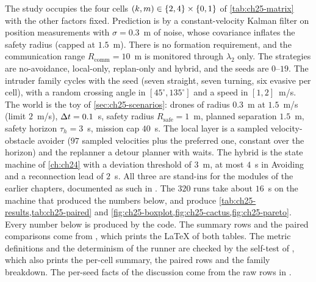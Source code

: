 \begin{example}
\label{ex:ch25-study}
The study occupies the four cells $(k, m) \in \left\{ 2, 4 \right\} \times \left\{ 0, 1 \right\}$
of \cref{tab:ch25-matrix} with the other factors fixed. Prediction is by a
constant-velocity Kalman filter on position measurements with
$\sigma = 0.3$~m of noise, whose covariance inflates the safety radius
(capped at $1.5$~m). There is no formation requirement, and the
communication range $R_{\mathrm{comm}} = 10$~m is monitored through
$\lambda_2$ only. The strategies are no-avoidance, local-only, replan-only
and hybrid, and the seeds are $0$--$19$. The intruder family cycles with the
seed (seven straight, seven turning, six evasive per cell), with a random
crossing angle in $[45^\circ, 135^\circ]$ and a speed in $[1, 2]$~m/s. The
world is the toy of
\cref{sec:ch25-scenarios}: drones of radius $0.3$~m at $1.5$~m/s (limit
$2$~m/s), $\Delta t = 0.1$~s, safety radius $R_{\mathrm{safe}} = 1$~m, planned
separation $1.5$~m, safety horizon $\tau_h = 3$~s, mission cap $40$~s. The
local layer is a sampled velocity-obstacle avoider ($97$ sampled velocities
plus the preferred one, constant over the horizon) and the replanner a
detour planner with waits. The hybrid is the state machine of
\cref{ch:ch24} with a deviation threshold of
$3$~m, at most $4$~s in Avoiding and a reconnection lead of $2$~s. All three
are stand-ins for the modules of the earlier chapters, documented as such in
. The $320$ runs take about $16$~s on the machine
that produced the numbers below, and produce \cref{tab:ch25-results,tab:ch25-paired} and
\cref{fig:ch25-boxplot,fig:ch25-cactus,fig:ch25-pareto}. Every number below
is produced by the code. The summary rows and the paired comparisons come
from , which prints the \LaTeX{} of both tables.
The metric definitions and the determinism of the runner are checked by the
self-test of , which also prints the per-cell
summary, the paired rows and the family breakdown. The per-seed facts of the
discussion come from the raw rows in .
\end{example}

